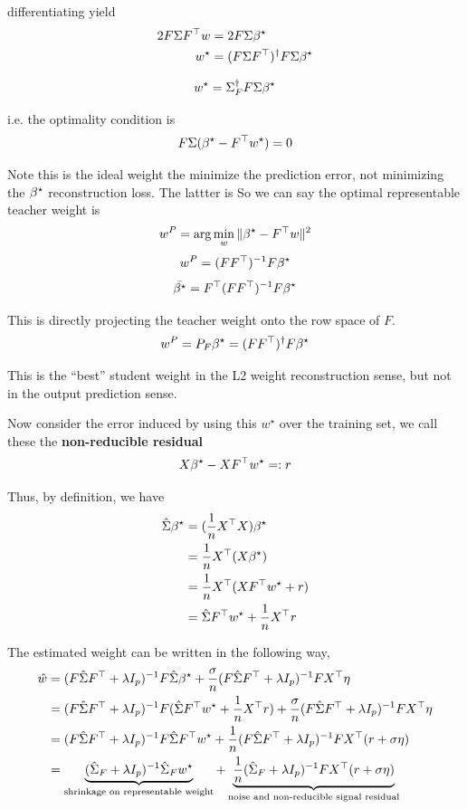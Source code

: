 differentiating yield
\begin{align*}
2F\Sigma F^{\top}w & =2F\Sigma{\beta^{\star}}\\
w^{\star} & =(F\Sigma F^{\top})^{\dagger}F\Sigma{\beta^{\star}}
\end{align*}

\begin{equation}
w^{\star}=\Sigma_{F}^{\dagger}F\Sigma{\beta^{\star}}\label{eq:feat_regr_optim_weight}
\end{equation}

i.e. the optimality condition is
\begin{equation}
F\Sigma({\beta^{\star}}-F^{\top}w^{\star})=0\label{eq:feat_regr_optim_weight_condition}
\end{equation}

Note this is the ideal weight the minimize the prediction error, not
minimizing the ${\beta^{\star}}$ reconstruction loss. The lattter is
So we can say the optimal representable teacher weight is
\[
w^{P}=\arg\min_{w}\|{\beta^{\star}}-F^{\top}w\|^{2}
\]
\[
w^{P}=(FF^{\top})^{-1}F{\beta^{\star}}
\]
\[
\bar{{\beta^{\star}}}=F^{\top}(FF^{\top})^{-1}F{\beta^{\star}}
\]

This is directly projecting the teacher weight onto the row space
of $F$.
\[
w^{P}=P_{F}{\beta^{\star}}=(FF^{\top})^{\dagger}F{\beta^{\star}}
\]

This is the ``best'' student weight in the L2 weight reconstruction
sense, but not in the output prediction sense.

Now consider the error induced by using this $w^{\star}$ over the
training set, we call these the \textbf{non-reducible residual}
\[
X{\beta^{\star}}-XF^{\top}w^{\star}=:r
\]

Thus, by definition, we have
\begin{align*}
\hat{\Sigma}{\beta^{\star}} & =(\frac{1}{n}X^{\top}X){\beta^{\star}}\\
 & =\frac{1}{n}X^{\top}(X{\beta^{\star}})\\
 & =\frac{1}{n}X^{\top}(XF^{\top}w^{\star}+r)\\
 & =\hat{\Sigma}F^{\top}w^{\star}+\frac{1}{n}X^{\top}r
\end{align*}

The estimated weight can be written in the following way,
\begin{align*}
\hat{w} & =(F\hat{\Sigma}F^{\top}+\lambda I_{p})^{-1}F\hat{\Sigma}{\beta^{\star}}+\frac{\sigma}{n}(F\hat{\Sigma}F^{\top}+\lambda I_{p})^{-1}FX^{\top}\eta\\
 & =(F\hat{\Sigma}F^{\top}+\lambda I_{p})^{-1}F(\hat{\Sigma}F^{\top}w^{\star}+\frac{1}{n}X^{\top}r)+\frac{\sigma}{n}(F\hat{\Sigma}F^{\top}+\lambda I_{p})^{-1}FX^{\top}\eta\\
 & =(F\hat{\Sigma}F^{\top}+\lambda I_{p})^{-1}F\hat{\Sigma}F^{\top}w^{\star}+\frac{1}{n}(F\hat{\Sigma}F^{\top}+\lambda I_{p})^{-1}FX^{\top}(r+\sigma\eta)\\
 & =\underbrace{(\hat{\Sigma}_{F}+\lambda I_{p})^{-1}\hat{\Sigma}_{F}w^{\star}}_{\text{shrinkage on representable weight}}+\underbrace{\frac{1}{n}(\hat{\Sigma}_{F}+\lambda I_{p})^{-1}FX^{\top}(r+\sigma\eta)}_{\text{noise and non-reducible signal residual}}
\end{align*}

